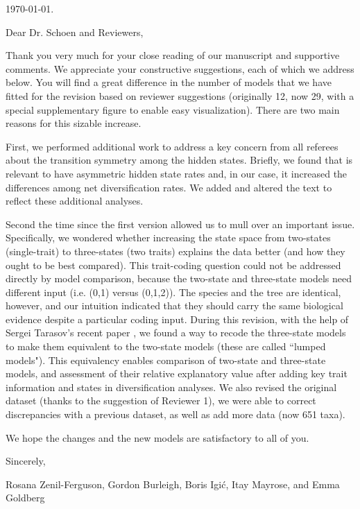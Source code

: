 \documentclass[11pt]{article}
\begin{document}
\hfill \today.

Dear Dr. Schoen and Reviewers,

\medskip
Thank you very much for your close reading of our manuscript and supportive comments. We appreciate your constructive suggestions, each of which we address below. You will find a great difference in the number of models that we have fitted for the revision based on reviewer suggestions (originally 12, now 29, with a special supplementary figure to enable easy visualization). There are two main reasons for this sizable increase. 

First, we performed additional work to address a key concern from all referees about the transition symmetry among the hidden states. 
Briefly, we found that is relevant to have asymmetric hidden state rates and, in our case, it increased the differences among net diversification rates. 
We added and altered the text to reflect these additional analyses. 

Second the time since the first version allowed us to mull over an important issue. 
Specifically, we wondered whether increasing the state space from two-states (single-trait) to three-states (two traits) explains the data better (and how they ought to be best compared). 
This trait-coding question could not be addressed directly by model comparison, because the two-state and three-state models need different input (i.e. (0,1) versus (0,1,2)). 
The species and the tree are identical, however, and our intuition indicated that they should carry the same biological evidence despite a particular coding input. 
During this revision, with the help of Sergei Tarasov's recent paper \citep{tarasov_2019}, we found a way to recode the three-state models to make them equivalent to the two-state models (these are called ``lumped models"). 
This equivalency enables comparison of two-state and three-state models, and assessment of their relative explanatory value after adding key trait information and states in diversification analyses.
We also revised the original dataset (thanks to the suggestion of Reviewer 1), we were able to correct discrepancies with a previous dataset, as well as add more data (now 651 taxa).

We hope the changes and the new models are satisfactory to all of you.

\medskip
Sincerely,

Rosana Zenil-Ferguson, Gordon Burleigh, Boris Igi\'c, Itay Mayrose, and Emma Goldberg


\end{document}
